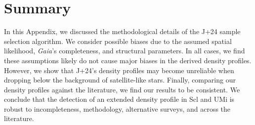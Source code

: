 \section{Summary}\label{summary}

In this Appendix, we discussed the methodological details of the J+24
sample selection algorithm. We consider possible biases due to the
assumed spatial likelihood, \emph{Gaia}'s completeness, and structural
parameters. In all cases, we find these assumptions likely do not cause
major biases in the derived density profiles. However, we show that
J+24's density profiles may become unreliable when dropping below the
background of satellite-like stars. Finally, comparing our density
profiles against the literature, we find our results to be consistent.
We conclude that the detection of an extended density profile in Scl and
UMi is robust to incompleteness, methodology, alternative surveys, and
across the literature.
